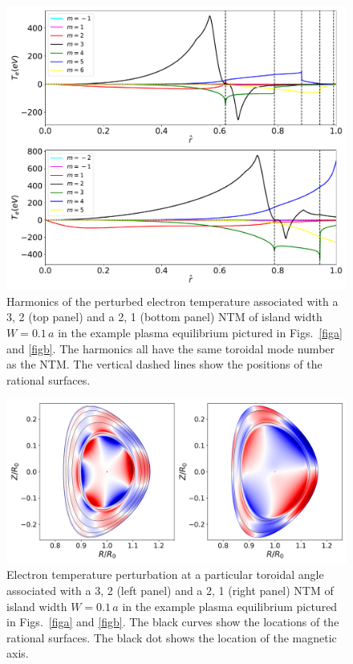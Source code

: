 \documentclass{iopjournal}
\begin{document}
{\begin{figure}
\centerline{\includegraphics[width=\textwidth]{Fig12.pdf}}
\caption{Harmonics of the perturbed electron temperature associated with a 3, 2 (top panel) and a 2, 1 (bottom panel) NTM of island width $W=0.1\,a$ in the example plasma equilibrium pictured in Figs.~\ref{figa}
and \ref{figb}. The harmonics all have the same toroidal mode number as the NTM. The vertical dashed lines show the positions of the rational surfaces. \label{fig10}}
\end{figure}

\begin{figure}
\centerline{\includegraphics[width=\textwidth]{Fig13.png}}
\caption{Electron temperature perturbation at a particular toroidal angle associated with a 3, 2 (left panel) and a 2, 1 (right panel) NTM of island width $W=0.1\,a$ in the example plasma equilibrium pictured in Figs.~\ref{figa}
and \ref{figb}. The black curves show the locations of the rational surfaces. The black dot shows the location of the magnetic axis.\label{fig11}}
\end{figure}

}
\end{document}
